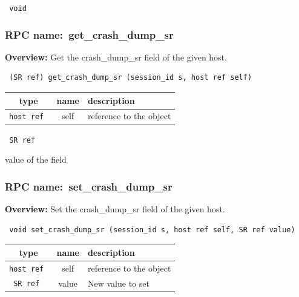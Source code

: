 \vspace{0.3cm}

{\tt 
void
}



\vspace{0.3cm}
\vspace{0.3cm}
\vspace{0.3cm}
\subsubsection{RPC name:~get\_crash\_dump\_sr}

{\bf Overview:} 
Get the crash\_dump\_sr field of the given host.

\begin{verbatim} (SR ref) get_crash_dump_sr (session_id s, host ref self)\end{verbatim}



 
\vspace{0.3cm}
\begin{tabular}{|c|c|p{7cm}|}
 \hline
{\bf type} & {\bf name} & {\bf description} \\ \hline
{\tt host ref } & self & reference to the object \\ \hline 

\end{tabular}

\vspace{0.3cm}

{\tt 
SR ref
}


value of the field
\vspace{0.3cm}
\vspace{0.3cm}
\vspace{0.3cm}
\subsubsection{RPC name:~set\_crash\_dump\_sr}

{\bf Overview:} 
Set the crash\_dump\_sr field of the given host.

\begin{verbatim} void set_crash_dump_sr (session_id s, host ref self, SR ref value)\end{verbatim}



 
\vspace{0.3cm}
\begin{tabular}{|c|c|p{7cm}|}
 \hline
{\bf type} & {\bf name} & {\bf description} \\ \hline
{\tt host ref } & self & reference to the object \\ \hline 

{\tt SR ref } & value & New value to set \\ \hline 

\end{tabular}

